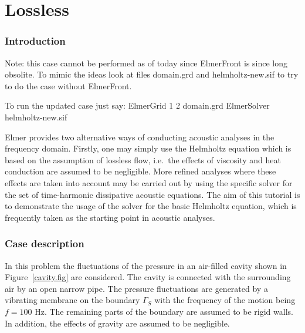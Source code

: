 \chapter{Lossless }



\subsection*{Introduction}

Note: this case cannot be performed as of today since ElmerFront is
since long obsolite. To mimic the ideas look at files domain.grd and
helmholtz-new.sif to try to do the case without ElmerFront.

To run the updated case just say:
\ttbegin
ElmerGrid 1 2 domain.grd
ElmerSolver helmholtz-new.sif
\ttend

Elmer provides two alternative ways of conducting acoustic analyses in the
frequency domain. Firstly, one may simply use the Helmholtz equation which 
is based on the assumption of lossless flow, i.e.\ the effects of viscosity 
and heat conduction are assumed to be negligible. More refined analyses where 
these effects are taken into account may be carried out by using the specific 
solver for the set of time-harmonic dissipative acoustic equations. 
The aim of this tutorial is to demonstrate the usage of the solver
for the basic Helmholtz equation, which is frequently taken as the starting
point in acoustic analyses. 

\subsection*{Case description}

In this problem the fluctuations of the pressure in an air-filled
cavity shown in Figure~\ref{cavity.fig} are considered. The cavity is 
connected with the surrounding air by an open narrow pipe. The pressure 
fluctuations are generated by a vibrating membrane on the boundary $\Gamma_S$ 
with the frequency of the motion being $f=100$ Hz. 
The remaining parts of the boundary are assumed to be rigid walls. 
In addition, the effects of gravity are assumed to be negligible.

